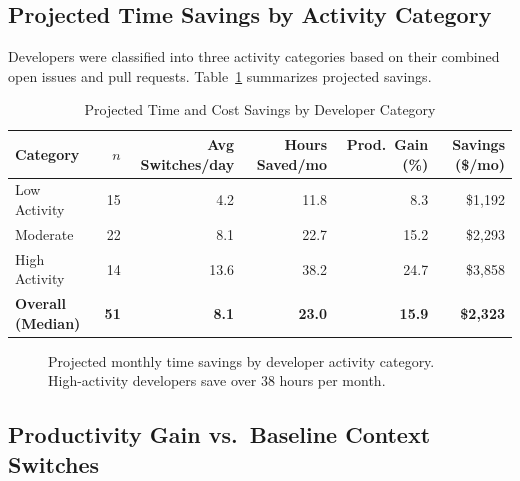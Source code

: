 \documentclass[12pt]{article}
\begin{document}
\subsection{Projected Time Savings by Activity Category}

Developers were classified into three activity categories based on their combined open issues and pull requests. Table~\ref{tab:savings} summarizes projected savings.

\begin{table}[H]
\centering
\caption{Projected Time and Cost Savings by Developer Category}
\label{tab:savings}
\begin{tabular}{@{}lrrrrr@{}}
\toprule
\textbf{Category} & \textbf{$n$} & \textbf{Avg Switches/day} & \textbf{Hours Saved/mo} & \textbf{Prod.\ Gain (\%)} & \textbf{Savings (\$/mo)} \\
\midrule
Low Activity    & 15 & 4.2  & 11.8 & 8.3  & \$1,192 \\
Moderate        & 22 & 8.1  & 22.7 & 15.2 & \$2,293 \\
High Activity   & 14 & 13.6 & 38.2 & 24.7 & \$3,858 \\
\midrule
\textbf{Overall (Median)} & \textbf{51} & \textbf{8.1} & \textbf{23.0} & \textbf{15.9} & \textbf{\$2,323} \\
\bottomrule
\end{tabular}
\end{table}

\begin{figure}[H]
\centering
{}
\caption{Projected monthly time savings by developer activity category. High-activity developers save over 38 hours per month.}
\label{fig:timesavings}
\end{figure}

\subsection{Productivity Gain vs.\ Baseline Context Switches}
\end{document}
